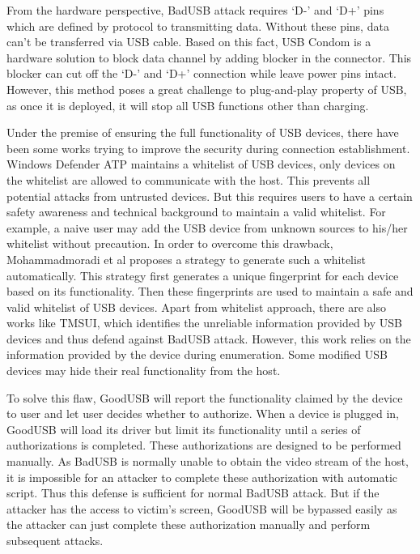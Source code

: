 From the hardware perspective, BadUSB attack requires `D-' and `D+' pins which are defined by protocol to transmitting data.
Without these pins, data can't be transferred via USB cable. Based on this fact, USB Condom \cite{Condom} is a hardware solution to block data channel by adding blocker in the connector. This blocker can cut off the `D-' and `D+' connection while leave power pins intact.
However, this method poses a great challenge to plug-and-play property of USB, as once it is deployed, it will stop all USB functions other than charging. 

Under the premise of ensuring the full functionality of USB devices, there have been some works trying to improve the security during connection establishment.
Windows Defender ATP\cite{windenfenderwhite} maintains a whitelist of USB devices, only devices on the whitelist are allowed to communicate with the host. This prevents all potential attacks from untrusted devices. But this requires users to have a certain safety awareness and technical background to maintain a valid whitelist. For example, a naive user may add the USB device from unknown sources to his/her whitelist without precaution. In order to overcome this drawback, Mohammadmoradi et al\cite{mohammadmoradi2018making} proposes a strategy to generate such a whitelist automatically. This strategy first generates a unique fingerprint for each device based on its functionality. Then these fingerprints are used to maintain a safe and valid whitelist of USB devices. Apart from whitelist approach, there are also works like TMSUI\cite{yang2015tmsui}, which identifies the unreliable information provided by USB devices and thus defend against BadUSB attack. However, this work relies on the information provided by the device during enumeration. Some modified USB devices may hide their real functionality from the host.

To solve this flaw, GoodUSB\cite{tian2015defending} will report the functionality claimed by the device to user and let user decides whether to authorize. When a device is plugged in, GoodUSB will load its driver but limit its functionality until a series of authorizations is completed. These authorizations are designed to be performed manually. As BadUSB is normally unable to obtain the video stream of the host, it is impossible for an attacker to complete these authorization with automatic script. Thus this defense is sufficient for normal BadUSB attack. But if the attacker has the access to victim's screen, GoodUSB will be bypassed easily as the attacker can just complete these authorization manually and perform subsequent attacks.

